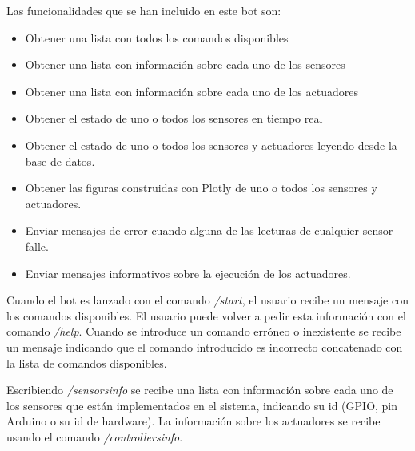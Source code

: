 \documentclass[a4paper, 12pt, oneside]{book}
\begin{document}
Las funcionalidades que se han incluido en este bot son:
\begin{itemize}
\item Obtener una lista con todos los comandos disponibles
\item Obtener una lista con información sobre cada uno de los sensores
\item Obtener una lista con información sobre cada uno de los actuadores
\item Obtener el estado de uno o todos los sensores en tiempo real
\item Obtener el estado de uno o todos los sensores y actuadores leyendo desde la base de datos.
\item Obtener las figuras construidas con Plotly de uno o todos los sensores y actuadores.
\item Enviar mensajes de error cuando alguna de las lecturas de cualquier sensor falle.
\item Enviar mensajes informativos sobre la ejecución de los actuadores.
\end{itemize}


Cuando el bot es lanzado con el comando \textit{/start}, el usuario recibe un mensaje con los comandos disponibles. El usuario puede volver a pedir esta información con el comando \textit{/help}.
Cuando se introduce un comando erróneo o inexistente se recibe un mensaje indicando que el comando introducido es incorrecto concatenado con la lista de comandos disponibles.


Escribiendo \textit{/sensorsinfo} se recibe una lista con información sobre cada uno de los sensores que están implementados en el sistema, indicando su id (GPIO, pin Arduino o su id de hardware). La información sobre los actuadores se recibe usando el comando \textit{/controllersinfo}.
\end{document}

